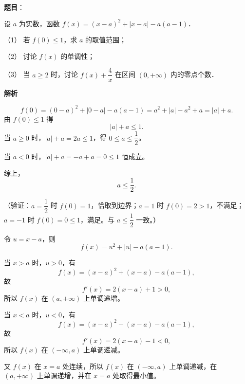 \begin{answer}



\end{answer}
\begin{answer}

\textbf{题目}：

设 \(a\) 为实数，函数 \(f(x)=(x-a)^2+|x-a|-a(a-1)\)．

（1） 若 \(f(0)\leqslant 1\)，求 \(a\) 的取值范围；

（2） 讨论 \(f(x)\) 的单调性；

（3） 当 \(a\geqslant 2\) 时，讨论 \(f(x)+\dfrac{4}{x}\) 在区间 \((0,+\infty)\) 内的零点个数．

\textbf{解析}


\nopagebreak[4]
\[
f(0)=(0-a)^2+|0-a|-a(a-1)=a^2+|a|-a^2+a=|a|+a.
\]
由 \(f(0)\leqslant1\) 得
\nopagebreak[4]
\[
|a|+a\leqslant1.
\]
当 \(a\geqslant0\) 时，\(|a|+a=2a\leqslant1\)，得 \(0\leqslant a\leqslant\dfrac12\)。

当 \(a<0\) 时，\(|a|+a=-a+a=0\leqslant1\) 恒成立。

综上，
\nopagebreak[4]
\[
a\leqslant\dfrac12.
\]

（验证：\(a=\dfrac12\) 时 \(f(0)=1\)，恰取到边界；\(a=1\) 时 \(f(0)=2>1\)，不满足；\(a=-1\) 时 \(f(0)=0\leqslant1\)，满足。与 \(a\leqslant\dfrac12\) 一致。）


令 \(u=x-a\)，则
\nopagebreak[4]
\[
f(x)=u^2+|u|-a(a-1).
\]

当 \(x>a\) 时，\(u>0\)，有
\nopagebreak[4]
\[
f(x)=(x-a)^2+(x-a)-a(a-1),
\]
故
\nopagebreak[4]
\[
f'(x)=2(x-a)+1>0,
\]
所以 \(f(x)\) 在 \((a,+\infty)\) 上单调递增。

当 \(x<a\) 时，\(u<0\)，有
\nopagebreak[4]
\[
f(x)=(x-a)^2-(x-a)-a(a-1),
\]
故
\nopagebreak[4]
\[
f'(x)=2(x-a)-1<0,
\]
所以 \(f(x)\) 在 \((-\infty,a)\) 上单调递减。

又 \(f(x)\) 在 \(x=a\) 处连续，所以 \(f(x)\) 在 \((-\infty,a)\) 上单调递减，在 \((a,+\infty)\) 上单调递增，并在 \(x=a\) 处取得最小值。


\end{answer}
